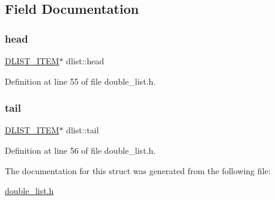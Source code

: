 \subsection{Field Documentation}
\hypertarget{structdlist_a8b41eb6a98fac7979652003285f65313}{}\label{structdlist_a8b41eb6a98fac7979652003285f65313} 
\subsubsection{\texorpdfstring{head}{head}}
{\footnotesize\ttfamily \hyperlink{double__list_8h_ad2863d2b4efe59432e1868606a5b74b6}{D\+L\+I\+S\+T\+\_\+\+I\+T\+EM}$\ast$ dlist\+::head}



Definition at line 55 of file double\+\_\+list.\+h.

\hypertarget{structdlist_af47038909dd24dd5205cbb96509a48bf}{}\label{structdlist_af47038909dd24dd5205cbb96509a48bf} 
\subsubsection{\texorpdfstring{tail}{tail}}
{\footnotesize\ttfamily \hyperlink{double__list_8h_ad2863d2b4efe59432e1868606a5b74b6}{D\+L\+I\+S\+T\+\_\+\+I\+T\+EM}$\ast$ dlist\+::tail}



Definition at line 56 of file double\+\_\+list.\+h.



The documentation for this struct was generated from the following file\+:\begin{DoxyCompactItemize}
\item 
\hyperlink{double__list_8h}{double\+\_\+list.\+h}\end{DoxyCompactItemize}

